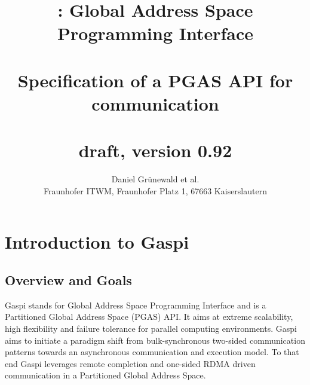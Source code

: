 \documentclass[a4paper]{article}
\title{\GASPI{}: Global Address Space Programming Interface\\
~\\
Specification of a PGAS API for communication\\
~\\
draft, version 0.92
}
\author{Daniel Gr\"unewald et al.\\
Fraunhofer ITWM, Fraunhofer Platz 1, 67663 Kaiserslautern
}
\makeatletter
\newlength{\st}\setlength{\st}{0pt}
\newcommand{\GASPI}{{\sc Gaspi}}
\newcounter{counttodo}
\newlength{\savetabcolsep}
\newlength{\savearrayrulewidth}
\newenvironment{todo}
{\stepcounter{counttodo}
 \typeout{Environment TODO call \thecounttodo}
 \setlength{\savetabcolsep}{\tabcolsep}
 \setlength{\savearrayrulewidth}{\arrayrulewidth}
 \renewcommand{\tabcolsep}{0pt}
 \renewcommand{\arrayrulewidth}{2pt}
 \begin{center}
 \begin{tabular}{c|l@{\hspace*{2em}}|@{\hspace*{2em}}c}
 &
 \begin{minipage}{0.66\textwidth}
 \begin{itemize}
}
{\end{itemize}
 \end{minipage}
 &  todo \#\thecounttodo
 \end{tabular} \marginpar{$\Longleftarrow$}
 \end{center}
 \renewcommand{\tabcolsep}{\savetabcolsep}
 \renewcommand{\arrayrulewidth}{\savearrayrulewidth}
}
\makeatother
\begin{document}
\begin{titlepage}
\maketitle
\end{titlepage}

\tableofcontents


\newpage



\section{Introduction to \GASPI{}}
\label{sec::Intro}

\subsection{Overview and Goals}
\label{subsec::Overview}

\GASPI{} stands for Global Address Space Programming Interface and
is a Partitioned Global Address Space (PGAS) API. It aims at
extreme scalability, high flexibility and failure tolerance for parallel
computing environments.  \GASPI{} aims
to initiate a paradigm shift from bulk-synchronous two-sided
communication patterns towards an asynchronous communication and
execution model. To that end \GASPI{} leverages remote completion and 
one-sided RDMA driven communication in a Partitioned Global Address Space.
\end{document}
